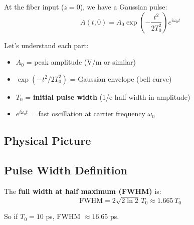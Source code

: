 \documentclass[12pt]{article}
\begin{document}
At the fiber input ($z = 0$), we have a Gaussian pulse:
\begin{equation}
\boxed{A(t, 0) = A_0 \exp\left(-\frac{t^2}{2T_0^2}\right) e^{i\omega_0 t}}
\end{equation}

Let's understand each part:

\begin{itemize}
\item $A_0$ = peak amplitude (V/m or similar)
\item $\exp(-t^2/2T_0^2)$ = Gaussian envelope (bell curve)
\item $T_0$ = \textbf{initial pulse width} (1/e half-width in amplitude)
\item $e^{i\omega_0 t}$ = fast oscillation at carrier frequency $\omega_0$
\end{itemize}

\subsection{Physical Picture}

\begin{center}
\end{center}

\subsection{Pulse Width Definition}

The \textbf{full width at half maximum (FWHM)} is:
\begin{equation}
\text{FWHM} = 2\sqrt{2\ln 2} \, T_0 \approx 1.665 \, T_0
\end{equation}

So if $T_0 = 10$ ps, FWHM $\approx 16.65$ ps.
\end{document}
